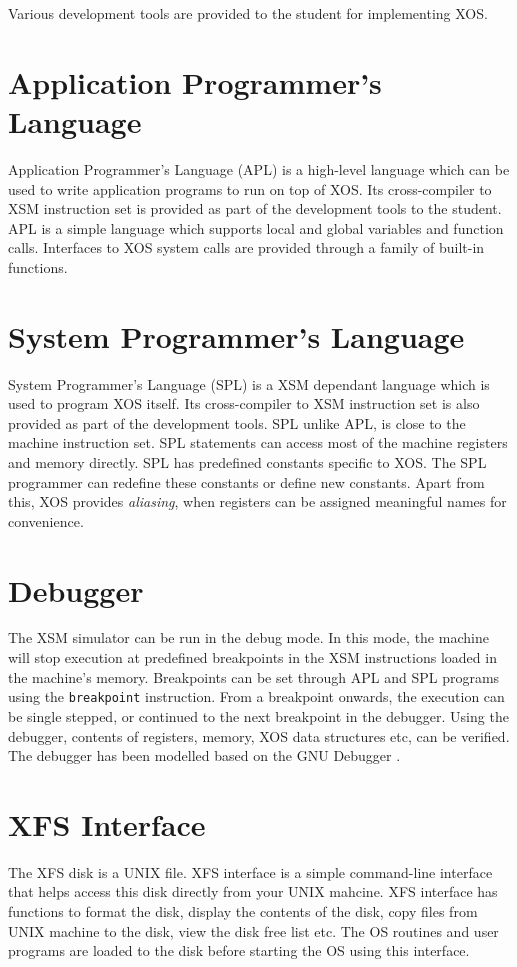 \documentclass[10pt]{report}
\begin{document}
Various development tools are provided to the student for implementing XOS. 

\section{Application Programmer's Language}
Application Programmer's Language (APL) is a high-level language which can be used to write application programs to run on top of XOS. Its cross-compiler to XSM instruction set is provided as part of the development tools to the student. APL is a simple language which supports local and global variables and function calls. Interfaces to XOS system calls are provided through a family of built-in functions. \\


\section{System Programmer's Language}
System Programmer's Language (SPL) is a XSM dependant language which is used to program XOS itself. Its cross-compiler to XSM instruction set is also provided as part of the development tools. SPL unlike APL, is close to the machine instruction set. SPL statements can access most of the machine registers and memory directly. SPL has predefined constants specific to XOS. The SPL programmer can redefine these constants or define new constants. Apart from this, XOS provides \textit{aliasing}, when registers can be assigned meaningful names for convenience.\\


\section{Debugger}
The XSM simulator can be run in the debug mode. In this mode, the machine will stop execution at predefined breakpoints in the XSM instructions loaded in the machine's memory. Breakpoints can be set through APL and SPL programs using the \texttt{breakpoint} instruction. From a breakpoint onwards, the execution can be single stepped, or continued to the next breakpoint in the debugger. Using the debugger, contents of registers, memory, XOS data structures etc, can be verified. The debugger has been modelled based on the GNU Debugger \cite{gdb}.\\


\section{XFS Interface}
The XFS disk is a UNIX file. XFS interface is a simple command-line interface that helps access this disk directly from your UNIX mahcine. XFS interface has functions to format the disk, display the contents of the disk, copy files from UNIX machine to the disk, view the disk free list etc. The OS routines and user programs are loaded to the disk before starting the OS using this interface.\\
\end{document}

